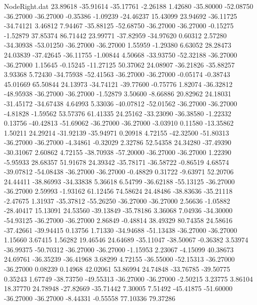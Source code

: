 \begin{filecontents}{NodeRight.dat}
  23.89618  -35.91614  -35.17761    -2.26188    1.42680  -35.80000  -52.08750  -36.27000  -36.27000   -0.35386   -1.09239  -24.46237   15.43099
  23.94692  -36.11725  -34.74121     3.46812    7.94467  -35.88125  -52.68750  -36.27000  -36.27000   -0.15275   -1.52879   37.85374   86.71442
  23.99771  -37.82959  -34.97620     0.60312    2.57280  -34.30938  -53.01250  -36.27000  -36.27000    1.55959   -1.29380    6.63052   28.28473
  24.03839  -37.42645  -36.11755    -1.00844    4.50668  -33.93750  -52.32188  -36.27000  -36.27000    1.15645   -0.15245  -11.27125   50.37062
  24.08907  -36.21826  -35.88257     3.93368    5.72430  -34.75938  -52.41563  -36.27000  -36.27000   -0.05174   -0.38743   45.01669   65.50844
  24.13973  -34.74121  -39.77600    -0.75776    1.82074  -36.32812  -48.95938  -36.27000  -36.27000   -1.52879    3.50600   -8.66886   20.82962
  24.18031  -31.45172  -34.67438     4.64993    5.33036  -40.07812  -52.01562  -36.27000  -36.27000   -4.81828   -1.59562   53.57376   61.41335
  24.25162  -33.23090  -36.38580    -1.22332    0.13756  -40.42813  -51.69062  -36.27000  -36.27000   -3.03910    0.11580  -13.35862    1.50211
  24.29214  -31.92139  -35.94971     0.20918    4.72155  -42.32500  -51.80313  -36.27000  -36.27000   -4.34861   -0.32029    2.32786   52.54358
  24.34280  -37.49390  -30.31067     2.60862    4.72155  -38.70938  -57.20000  -36.27000  -36.27000    1.22390   -5.95933   28.68357   51.91678
  24.39342  -35.78171  -36.58722    -0.86519    4.68574  -39.07812  -54.08438  -36.27000  -36.27000   -0.48829    0.31722   -9.63971   52.20706
  24.44411  -38.86993  -34.33838     5.36618    6.54799  -36.62188  -55.13125  -36.27000  -36.27000    2.59993   -1.93162   61.12456   74.58624
  24.48486  -38.83636  -35.21118    -2.47675    1.31937  -35.37812  -55.26250  -36.27000  -36.27000    2.56636   -1.05882  -28.40417   15.13091
  24.53560  -39.13849  -35.78186     3.36068    7.04936  -34.30000  -54.93125  -36.27000  -36.27000    2.86849   -0.48814   38.49329   80.74358
  24.58616  -37.42661  -39.94415     0.13756    1.71330  -34.94688  -51.13438  -36.27000  -36.27000    1.15660    3.67415    1.56282   19.46546
  24.64689  -35.11047  -38.50067    -0.36382    3.53974  -36.99375  -50.70312  -36.27000  -36.27000   -1.15953    2.23067   -4.15099   40.38673
  24.69761  -36.35239  -36.41968     3.68299    4.72155  -36.55000  -52.15313  -36.27000  -36.27000    0.08239    0.14968   42.02061   53.86994
  24.74848  -33.76785  -39.50775     0.35243    1.67749  -38.73750  -49.55313  -36.27000  -36.27000   -2.50215    3.23775    3.86104   18.37770
  24.78948  -27.82669  -35.71442     7.30005    7.51492  -45.41875  -51.60000  -36.27000  -36.27000   -8.44331   -0.55558   77.10336   79.37286

\end{filecontents}
